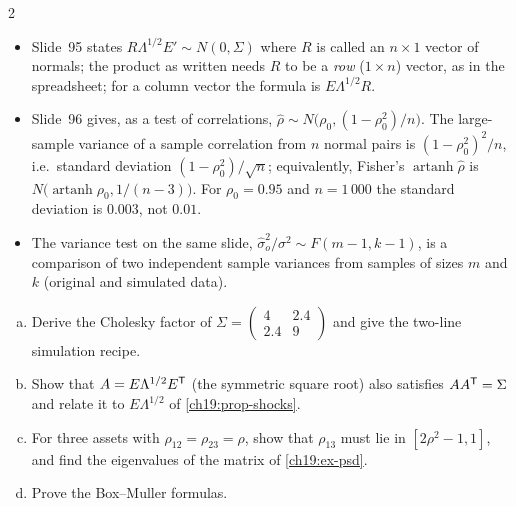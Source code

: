 \begin{paracol}{2}
\begin{coursenote}\label{ch19:cn-slide95}
\begin{itemize}
  \item Slide~95 states $R\Lambda^{1/2}E'\sim N(0,\Sigma)$ where $R$ is called an $n\times1$ vector of normals; the product as written needs $R$ to be a \emph{row} ($1\times n$) vector, as in the spreadsheet; for a column vector the formula is $E\Lambda^{1/2}R$.
  \item Slide~96 gives, as a test of correlations, $\hat\rho\sim N\bigl(\rho_0,(1-\rho_0^2)/n\bigr)$. The large-sample variance of a sample correlation from $n$ normal pairs is $(1-\rho_0^2)^2/n$, i.e.\ standard deviation $(1-\rho_0^2)/\sqrt n$; equivalently, Fisher's $\operatorname{artanh}\hat\rho$ is $N\bigl(\operatorname{artanh}\rho_0,1/(n-3)\bigr)$. For $\rho_0=0.95$ and $n=1\,000$ the standard deviation is $0.003$, not $0.01$.
  \item The variance test on the same slide, $\hat\sigma_o^2/\sigma^2\sim F(m-1,k-1)$, is a comparison of two independent sample variances from samples of sizes $m$ and $k$ (original and simulated data).
\end{itemize}
\end{coursenote}

\begin{exercise}
\leavevmode
\begin{enumerate}[(a)]
  \item Derive the Cholesky factor of $\Sigma=\begin{pmatrix}4&2.4\\2.4&9\end{pmatrix}$ and give the two-line simulation recipe.
  \item Show that $A=E\Lambda^{1/2}E^{\mathsf T}$ (the symmetric square root) also satisfies $AA^{\mathsf T}=\Sigma$ and relate it to $E\Lambda^{1/2}$ of \cref{ch19:prop-shocks}.
  \item For three assets with $\rho_{12}=\rho_{23}=\rho$, show that $\rho_{13}$ must lie in $[2\rho^2-1,1]$, and find the eigenvalues of the matrix of \cref{ch19:ex-psd}.
  \item Prove the Box--Muller formulas.
\end{enumerate}
\end{exercise}


\end{paracol}
